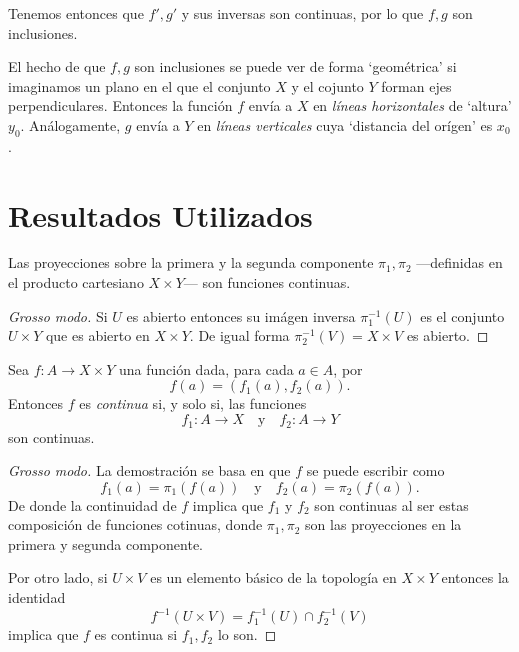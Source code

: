 \documentclass[mid,fleqn,final,oneside]{tareas}
\begin{document}
Tenemos entonces que $f',g'$ y sus inversas son
continuas, por lo que $f,g$ son inclusiones.

\begin{obs}
	El hecho de que $f,g$ son inclusiones se puede ver de forma `geométrica' si imaginamos un plano en el que el conjunto $X$ y el cojunto $Y$ forman ejes perpendiculares. Entonces la función $f$ envía a $X$ en \emph{líneas horizontales} de `altura' $y_0$. Análogamente, $g$ envía a $Y$ en \emph{líneas verticales} cuya `distancia del orígen' es $x_0$.
\end{obs}
\section*{Resultados Utilizados}

\begin{teo}
	Las proyecciones sobre la primera y la segunda componente $\pi_1,\pi_2$ ---definidas en el producto cartesiano $X\times Y$--- son funciones continuas.	
\end{teo}

\begin{proof}[Grosso modo]
	Si $U$ es abierto entonces su imágen inversa $\pi_1^{-1}(U)$ es el conjunto $U\times Y$ que es abierto en $X\times Y$. De igual forma $\pi_2^{-1}(V)=X\times V$ es abierto.
\end{proof}

\begin{teo}
Sea $f:A\to X\times Y$ una función dada, para cada $a\in A$, por
\[
	f(a)=(f_1(a),f_2(a)).
\]
Entonces $f$ es \emph{continua} si, y solo si, las funciones
\[
	f_1:A\to X\quad\text{y}\quad f_2:A\to Y 
\]
son continuas. 
\end{teo}

\begin{proof}[Grosso modo]
	La demostración se basa en que $f$ se puede escribir como
	\[
		f_1(a)=\pi_1(f(a))\quad\text{y}\quad
		f_2(a)=\pi_2(f(a)).
	\]
	De donde la continuidad de $f$ implica que $f_1$ y $f_2$ son continuas
	al ser estas composición de funciones cotinuas, donde $\pi_1,\pi_2$ son las proyecciones en la primera y segunda componente.

	Por otro lado, si $U\times V$ es un elemento básico de la topología en $X\times Y$ entonces la identidad
	\[
		f^{-1}(U\times V) = f_1^{-1}(U)\cap f_2^{-1}(V)
	\]
	implica que $f$ es continua si $f_1,f_2$ lo son.
\end{proof}
\end{document}
